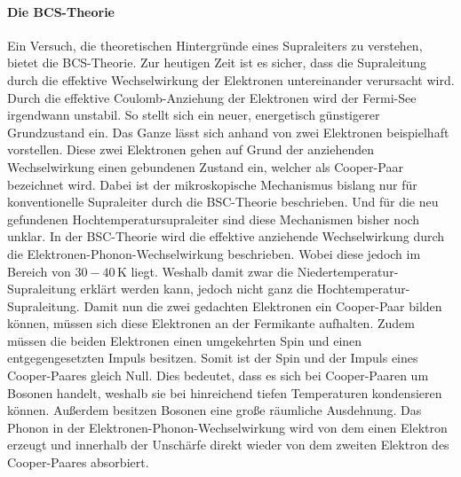 \paragraph{Die BCS-Theorie}
Ein Versuch, die theoretischen Hintergr\"unde eines Supraleiters zu verstehen, bietet die BCS-Theorie.
Zur heutigen Zeit ist es sicher, dass die Supraleitung durch die effektive Wechselwirkung der Elektronen untereinander verursacht wird.
Durch die effektive Coulomb-Anziehung der Elektronen wird der Fermi-See irgendwann unstabil.
So stellt sich ein neuer, energetisch g\"unstigerer Grundzustand ein.
Das Ganze l\"asst sich anhand von zwei Elektronen beispielhaft vorstellen.
Diese zwei Elektronen gehen auf Grund der anziehenden Wechselwirkung einen gebundenen Zustand ein, welcher als Cooper-Paar bezeichnet wird.
Dabei ist der mikroskopische Mechanismus bislang nur f\"ur konventionelle Supraleiter durch die BSC-Theorie beschrieben.
Und f\"ur die neu gefundenen Hochtemperatursupraleiter sind diese Mechanismen bisher noch unklar.
In der BSC-Theorie wird die effektive anziehende Wechselwirkung durch die Elektronen-Phonon-Wechselwirkung beschrieben.
Wobei diese jedoch im Bereich von $30-40 \, $K liegt.
Weshalb damit zwar die Niedertemperatur-Supraleitung erkl\"art werden kann, jedoch nicht ganz die Hochtemperatur-Supraleitung.
Damit nun die zwei gedachten Elektronen ein Cooper-Paar bilden k\"onnen, m\"ussen sich diese Elektronen an der Fermikante aufhalten.
Zudem m\"ussen die beiden Elektronen einen umgekehrten Spin und einen entgegengesetzten Impuls besitzen.
Somit ist der Spin und der Impuls eines Cooper-Paares gleich Null.
Dies bedeutet, dass es sich bei Cooper-Paaren um Bosonen handelt, weshalb sie bei hinreichend tiefen Temperaturen kondensieren k\"onnen.
Au{\ss}erdem besitzen Bosonen eine gro{\ss}e r\"aumliche Ausdehnung.
Das Phonon in der Elektronen-Phonon-Wechselwirkung wird von dem einen Elektron erzeugt und innerhalb der Unsch\"arfe direkt wieder von dem zweiten Elektron des Cooper-Paares absorbiert.
